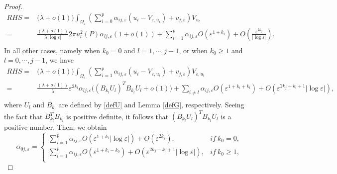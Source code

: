 \documentclass[11pt,reqno]{article}
\numberwithin{equation}{section}
\newcommand\e\varepsilon
\newcommand\la\lambda
\renewcommand\O\Omega
\begin{document}
\begin{proof}
          \begin{equation}\label{eq0201-2}
            \begin{aligned}
                RHS=&\big(\la+o(1)\big)\int_{\O_\e}\left({ \sum_{i=0}^{p}}\alpha_{ij,\e} (u_i-V_{\e,u_i})+ v_{j,\e}\right)V_{u_l}\\
				=&\frac{(\la+o(1))}{\la |\log\e|}2\pi u_l^2(P)\alpha_{lj,\e}\left(1+o(1)\right)
        +{ \sum_{i=1}^{p}}\alpha_{ij,\e}O(\e^{1+{ k_i}})+O\left(\frac{\e^{2{ k_j}}}{|\log\e|}\right).\\
            \end{aligned}
        \end{equation}
        In all other cases, namely when  $k_0=0$ and  $l=1,\cdots,j-1$, or when $ k_0\ge1$ and  $l=0,\cdots,j-1$, we have
        \begin{equation}\label{eq0201-R2}
            \begin{aligned}
                RHS=&\big(\la+o(1)\big)\int_{\O_\e}\left({ \sum_{i=1}^{p}}\alpha_{ij,\e} (u_i-V_{\e,u_i})+ v_{j,\e}\right)V_{\e,u_l}\\
				=&\frac{(\la+o(1))}{\la }\e^{2{ k_l}}\alpha_{lj,\e}\Bigg((B_{ k_l}U_l)^TB_{ k_l}U_l+o(1)\Bigg)+\sum_{i\neq l}\alpha_{ij,\e}O(\e^{1+{ k_i}+{ k_l}})+O(\e^{2{ k_j}+{ k_l}+1}|\log\e|),\\
            \end{aligned}
        \end{equation}
          where $U_l$ and $B_{ k_l}$ are defined by \eqref{defU} and Lemma \ref{defG}, respectively.
 Seeing the fact that $B_{ k_l}^TB_{ k_l}$ is positive definite, it follows that $(B_{ k_l}U_l)^TB_{ k_l}U_l$ is a positive number. Then, we obtain 
\begin{equation}\label{eq0201-3}
    \alpha_{0j,\e}=
    \begin{cases}
       \displaystyle{ \sum_{i=1}^{p}}\alpha_{ij,\e}O(\e^{1+{ k_i}}|\log\e|)+O(\e^{2{ k_j}}), &if\ k_0=0,\\
      \displaystyle  { \sum_{i=1}^{p}}\alpha_{ij,\e}O(\e^{1+{ k_i-k_0}})+O(\e^{2{ k_j}-{ k_0}+1}|\log\e|), &if\ k_0\ge 1,\\

\end{cases}
\end{equation}
\end{proof}
\end{document}
